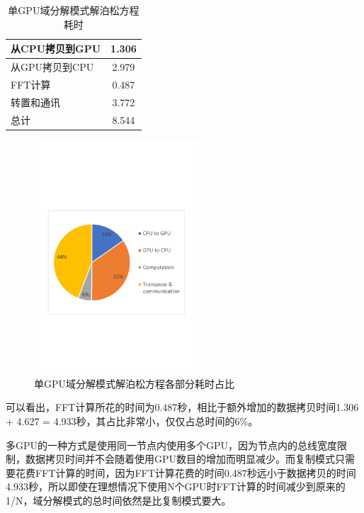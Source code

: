 \begin{table}[!htbp]
    \centering
    \footnotesize%
    \setlength{\tabcolsep}{4pt}%
    \renewcommand{\arraystretch}{1.2}%
    \begin{tabular}{lc}
        \hline\hline
        从CPU拷贝到GPU    & 1.306     \\
        \hline
        从GPU拷贝到CPU    & 2.979     \\
        \hline
        FFT计算                       & 0.487     \\
        \hline
        转置和通讯                  & 3.772     \\
        \hline
        总计                              & 8.544    \\
        \hline\hline
    \end{tabular}
    \caption{单GPU域分解模式解泊松方程耗时}
    \label{tab:1GPU_Poisson}
\end{table}

\begin{figure}[!htb]
    \centering
    \includegraphics[width=0.55\textwidth]{Img/domain_decomposition_1GPU.pdf}
    \caption{单GPU域分解模式解泊松方程各部分耗时占比}\label{fig:1GPU_Poisson}
\end{figure}

可以看出，FFT计算所花的时间为0.487秒，相比于额外增加的数据拷贝时间1.306 + 4.627 = 4.933秒，其占比非常小，仅仅占总时间的6\%。

多GPU的一种方式是使用同一节点内使用多个GPU，因为节点内的总线宽度限制，数据拷贝时间并不会随着使用GPU数目的增加而明显减少。而复制模式只需要花费FFT计算的时间，因为FFT计算花费的时间0.487秒远小于数据拷贝的时间4.933秒，所以即使在理想情况下使用N个GPU时FFT计算的时间减少到原来的1/N，域分解模式的总时间依然是比复制模式要大。

